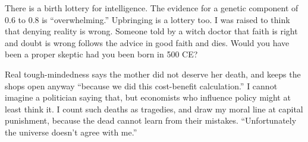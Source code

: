There is a birth lottery for intelligence. The evidence for a genetic component of 0.6 to 0.8 is ``overwhelming.''  Upbringing is a lottery too. I was raised to think that denying reality is wrong. Someone told by a witch doctor that faith is right and doubt is wrong follows the advice in good faith and dies. Would you have been a proper skeptic had you been born in 500 CE?

Real tough-mindedness says the mother did not deserve her death, and keeps the shops open anyway ``because we did this cost-benefit calculation.'' I cannot imagine a politician saying that, but economists who influence policy might at least think it. I count such deaths as tragedies, and draw my moral line at capital punishment, because the dead cannot learn from their mistakes. ``Unfortunately the universe doesn't agree with me.''
